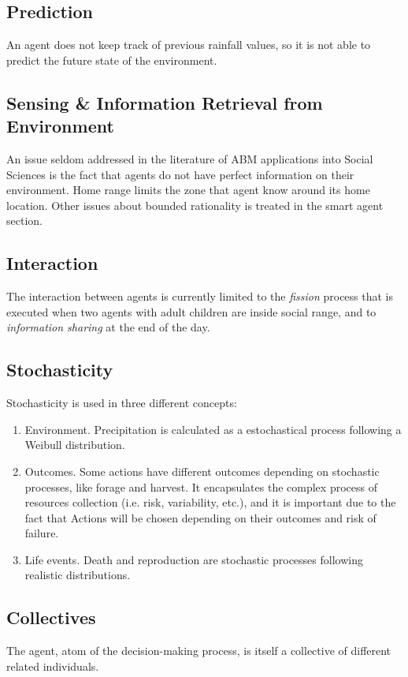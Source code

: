 \documentclass[11pt,oneside,a4paper,openright]{report}
\begin{document}
\subsection{Prediction}
An agent does not keep track of previous rainfall values, so it is not able to predict the future state of
the environment.
\subsection{Sensing \& Information Retrieval from Environment}
An issue seldom addressed in the literature of ABM applications into Social Sciences is the fact that
agents do not have perfect information on their environment. Home range limits the zone that agent
know around its home location. Other issues about bounded rationality is treated in the smart agent section.
 
\subsection{Interaction}
The interaction between agents is currently limited to the \emph{fission} process that is executed when two
agents with adult children are inside social range, and to \emph{information sharing} at the end of the day.


\subsection{Stochasticity}
Stochasticity is used in three different concepts:
\begin{enumerate}
\item Environment. Precipitation is calculated as a estochastical process following a Weibull
distribution.
\item Outcomes. Some actions have different outcomes depending on stochastic processes,
like forage and harvest. It encapsulates the complex process of resources collection (i.e.
risk, variability, etc.), and it is important due to the fact that Actions will be chosen
depending on their outcomes and risk of failure.
\item Life events. Death and reproduction are stochastic processes following realistic
distributions.
\end{enumerate}

\subsection{Collectives}
The agent, atom of the decision-making process, is itself a collective of different related individuals.
\end{document}
